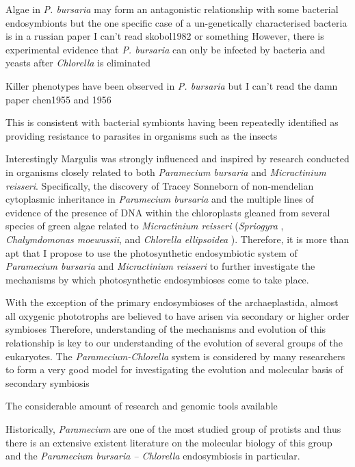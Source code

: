 Algae in \textit{P. bursaria} may form an antagonistic relationship with some bacterial endosymbionts but the one specific case
of a un-genetically characterised bacteria is in a russian paper I can't read skobol1982 or something 
However, there is experimental evidence that \textit{P. bursaria} can only be infected by bacteria and yeasts after
\textit{Chlorella} is eliminated \citep{Gortz1982}

Killer phenotypes have been observed in \textit{P. bursaria} but I can't read the damn paper chen1955 and 1956 \citep{Gortz2009}


This is consistent with bacterial symbionts having been repeatedly identified as providing resistance to parasites in organisms
such as the insects \citep{Martinez2014}


Interestingly Margulis was strongly influenced and inspired by research conducted
in organisms closely related to both \textit{Paramecium bursaria} and 
\textit{Micractinium reisseri}. Specifically, the discovery of Tracey Sonneborn
of non-mendelian cytoplasmic inheritance in \textit{Paramecium bursaria} \citep{Sonneborn1950}
and the multiple lines of evidence of the presence of DNA within the chloroplasts
gleaned from several species of green algae related to \textit{Micractinium reisseri}
(\textit{Spriogyra} \citep{Stocking1959}, \textit{Chalymdomonas moewussii}, and 
\textit{Chlorella ellipsoidea} \cite{Ris1962}).  Therefore, it is more than apt
that I propose to use the photosynthetic endosymbiotic system of \textit{Paramecium bursaria}
and \textit{Micractinium reisseri} to further investigate the mechanisms by which
photosynthetic endosymbioses come to take place.





With the exception of the primary endosymbioses of the archaeplastida, almost all oxygenic phototrophs are believed to have arisen via secondary or higher order symbioses \citep{Hoshina2009} 
Therefore, understanding of the mechanisms and evolution of this relationship is key to our understanding of the evolution of several groups of the eukaryotes. The \textit{Paramecium-Chlorella} system is considered by many researchers to form a very good model for investigating the evolution and molecular basis of secondary symbiosis \citep{Hoshina2009}

The considerable amount of research and genomic tools available 


Historically, \textit{Paramecium} are one of the most studied group of protists and thus there is an extensive existent literature on the molecular biology of this group and the \textit{Paramecium bursaria – Chlorella} endosymbiosis in particular.  

